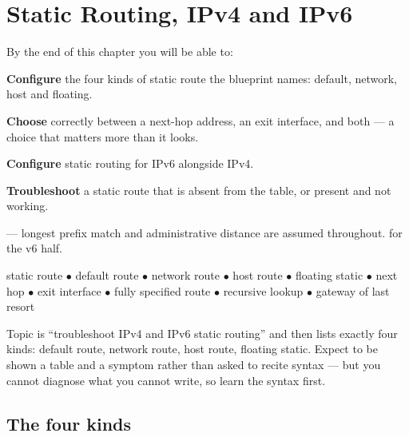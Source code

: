\chapter{Static Routing, IPv4 and IPv6}\label{ch:static}

\begin{outcomes}
By the end of this chapter you will be able to:
\begin{tight}
  \item \textbf{Configure} the four kinds of static route the blueprint names:
        default, network, host and floating.
  \item \textbf{Choose} correctly between a next-hop address, an exit interface,
        and both --- a choice that matters more than it looks.
  \item \textbf{Configure} static routing for IPv6 alongside IPv4.
  \item \textbf{Troubleshoot} a static route that is absent from the table, or
        present and not working.
\end{tight}
\end{outcomes}

\begin{prereq}
 --- longest prefix match and administrative distance are
assumed throughout.  for the v6 half.
\end{prereq}

\begin{keyterms}
static route $\bullet$ default route $\bullet$ network route $\bullet$ host route
$\bullet$ floating static $\bullet$ next hop $\bullet$ exit interface $\bullet$
fully specified route $\bullet$ recursive lookup $\bullet$ gateway of last resort
\end{keyterms}

\begin{examnote}
Topic  is ``troubleshoot IPv4 and IPv6 static routing'' and then lists
exactly four kinds: default route, network route, host route, floating static.
Expect to be shown a table and a symptom rather than asked to recite syntax ---
but you cannot diagnose what you cannot write, so learn the syntax first.
\end{examnote}

\section{The four kinds}

